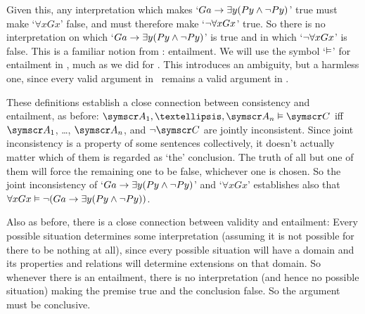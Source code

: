 \begin{earg}
Given this, any interpretation which makes `$Ga \rightarrow \exists y (Py \wedge \neg Py)$' true must make `$\forall x Gx$' false, and must therefore make `$\neg \forall x Gx$' true. So there is no interpretation on which `$Ga \rightarrow \exists y (Py \wedge \neg Py)$' is true and in which `$\neg \forall x Gx$' is false.  This is a familiar notion from \TFL: entailment. We will use the symbol `$\vDash$' for entailment in \FOL, much as we did for \TFL. This introduces an ambiguity, but a harmless one, since every valid argument in \TFL\ remains a valid argument in \FOL.  

These definitions establish a close connection between consistency and entailment, as before: $\meta{A}_{1},…,\meta{A}_{n} \entails \meta{C}$ iff $\meta{A}_{1}$, …, $\meta{A}_{n}$, and $\enot\meta{C}$ are jointly inconsistent. Since joint inconsistency is a property of some sentences collectively, it doesn't actually matter which of them is regarded as `the' conclusion. The truth of all but one of them will force the remaining one to be false, whichever one is chosen. So the joint inconsistency of `$Ga \rightarrow \exists y (Py \wedge \neg Py)$' and `$\forall x Gx$' establishes also that $\forall x Gx \vDash \neg (Ga \rightarrow \exists y (Py \wedge \neg Py))$. 


Also as before, there is a close connection between validity and entailment:  
Every possible situation determines some interpretation (assuming it is not possible for there to be nothing at all), since every possible situation will have a domain and its properties and relations will determine extensions on that domain. So whenever there is an entailment, there is no interpretation (and hence no possible situation) making the premise true and the conclusion false. So the argument must be conclusive.


\end{earg}
